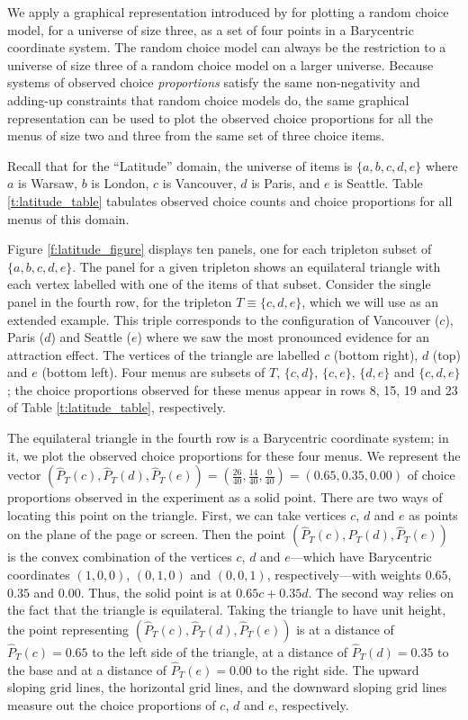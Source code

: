 \documentclass[11pt,letter]{article}
\newcommand{\menus}{menus}
\newcommand{\trip}{T}
\begin{document}
We apply a graphical representation introduced by \citet{McCaMarl13} for plotting a random choice model, for a universe of size three, as a set of four points in a Barycentric coordinate system.
The random choice model can always be the restriction to a universe of size three of a random choice model on a larger universe.
Because systems of observed choice {\em proportions} satisfy the same non-negativity and adding-up constraints that random choice models do, the same graphical representation can be used to plot the observed choice proportions for all the \menus{} of size two and three from the same set of three choice items.

Recall that for the ``Latitude'' domain, the universe of items is $\{a,b,c,d,e\}$ where $a$ is Warsaw, $b$ is London, $c$ is Vancouver, $d$ is Paris, and $e$ is Seattle.
Table \ref{t:latitude_table} tabulates observed choice counts and choice proportions for all \menus{} of this domain.

Figure \ref{f:latitude_figure} displays ten panels, one for each tripleton subset of $\{a,b,c,d,e\}$.
The panel for a given tripleton shows an equilateral triangle with each vertex labelled with one of the items of that subset.
Consider the single panel in the fourth row, for the tripleton $\trip \equiv \{c,d,e\}$, which we will use as an extended example.
This triple corresponds to the configuration of Vancouver ($c$), Paris ($d$) and Seattle ($e$) where we saw the most pronounced evidence for an attraction effect.
The vertices of the triangle are labelled $c$ (bottom right), $d$ (top) and $e$ (bottom left).
Four menus are subsets of $\trip$, $\{c,d\}$, $\{c,e\}$, $\{d,e\}$ and $\{c,d,e\}$; the choice proportions observed for these menus appear in rows 8, 15, 19 and 23 of Table \ref{t:latitude_table}, respectively.

The equilateral triangle in the fourth row is a Barycentric coordinate system; in it, we plot the observed choice proportions for these four menus.
We represent the vector $(\hat P_\trip(c), \hat P_\trip(d), \hat P_\trip(e)) = (\tfrac{26}{40}, \tfrac{14}{40}, \tfrac{0}{40}) = (0.65, 0.35, 0.00)$ of choice proportions observed in the experiment as a solid point.
There are two ways of locating this point on the triangle.
First, we can take vertices $c$, $d$ and $e$ as points on the plane of the page or screen.
Then the point $(\hat P_\trip(c),\hat P_\trip(d),\hat P_\trip(e))$ is the convex combination of the vertices $c$, $d$ and $e$---which have Barycentric coordinates $(1,0,0)$, $(0,1,0)$ and $(0,0,1)$, respectively---with weights $0.65$, $0.35$ and $0.00$.
Thus, the solid point is at $0.65 c + 0.35 d$.
The second way relies on the fact that the triangle is equilateral.
Taking the triangle to have unit height, the point representing $(\hat P_\trip(c),\hat P_\trip(d),\hat P_\trip(e))$ is at a distance of $\hat P_\trip(c) = 0.65$ to the left side of the triangle, at a distance of $\hat P_\trip(d) = 0.35$ to the base and at a distance of $\hat P_\trip(e) = 0.00$ to the right side.
The upward sloping grid lines, the horizontal grid lines, and the downward sloping grid lines measure out the choice proportions of $c$, $d$ and $e$, respectively.
\end{document}
